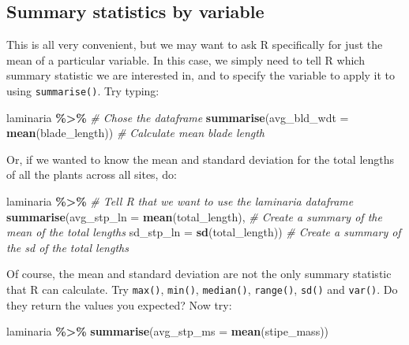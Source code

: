 \documentclass[
]{book}
\newenvironment{Shaded}{\begin{snugshade}}{\end{snugshade}}
\newcommand{\CommentTok}[1]{\textcolor[rgb]{0.56,0.35,0.01}{\textit{#1}}}
\newcommand{\DataTypeTok}[1]{\textcolor[rgb]{0.13,0.29,0.53}{#1}}
\newcommand{\KeywordTok}[1]{\textcolor[rgb]{0.13,0.29,0.53}{\textbf{#1}}}
\newcommand{\NormalTok}[1]{#1}
\newcommand{\OperatorTok}[1]{\textcolor[rgb]{0.81,0.36,0.00}{\textbf{#1}}}
\newcommand{\StringTok}[1]{\textcolor[rgb]{0.31,0.60,0.02}{#1}}
\begin{document}
\hypertarget{summary-statistics-by-variable}{%
\subsection{Summary statistics by variable}\label{summary-statistics-by-variable}}

This is all very convenient, but we may want to ask R specifically for just the mean of a particular variable. In this case, we simply need to tell R which summary statistic we are interested in, and to specify the variable to apply it to using \texttt{summarise()}. Try typing:

\begin{Shaded}
\begin{Highlighting}[]
\NormalTok{laminaria }\OperatorTok{\%>\%}\StringTok{ }\CommentTok{\# Chose the dataframe}
\StringTok{  }\KeywordTok{summarise}\NormalTok{(}\DataTypeTok{avg\_bld\_wdt =} \KeywordTok{mean}\NormalTok{(blade\_length)) }\CommentTok{\# Calculate mean blade length}
\end{Highlighting}
\end{Shaded}

Or, if we wanted to know the mean and standard deviation for the total lengths of all the plants across all sites, do:

\begin{Shaded}
\begin{Highlighting}[]
\NormalTok{laminaria }\OperatorTok{\%>\%}\StringTok{ }\CommentTok{\# Tell R that we want to use the \textquotesingle{}laminaria\textquotesingle{} dataframe}
\StringTok{  }\KeywordTok{summarise}\NormalTok{(}\DataTypeTok{avg\_stp\_ln =} \KeywordTok{mean}\NormalTok{(total\_length), }\CommentTok{\# Create a summary of the mean of the total lengths}
            \DataTypeTok{sd\_stp\_ln =} \KeywordTok{sd}\NormalTok{(total\_length)) }\CommentTok{\# Create a summary of the sd of the total lengths}
\end{Highlighting}
\end{Shaded}

Of course, the mean and standard deviation are not the only summary statistic that R can calculate. Try \texttt{max()}, \texttt{min()}, \texttt{median()}, \texttt{range()}, \texttt{sd()} and \texttt{var()}. Do they return the values you expected? Now try:

\begin{Shaded}
\begin{Highlighting}[]
\NormalTok{laminaria }\OperatorTok{\%>\%}\StringTok{ }
\StringTok{  }\KeywordTok{summarise}\NormalTok{(}\DataTypeTok{avg\_stp\_ms =} \KeywordTok{mean}\NormalTok{(stipe\_mass))}
\end{Highlighting}
\end{Shaded}
\end{document}
